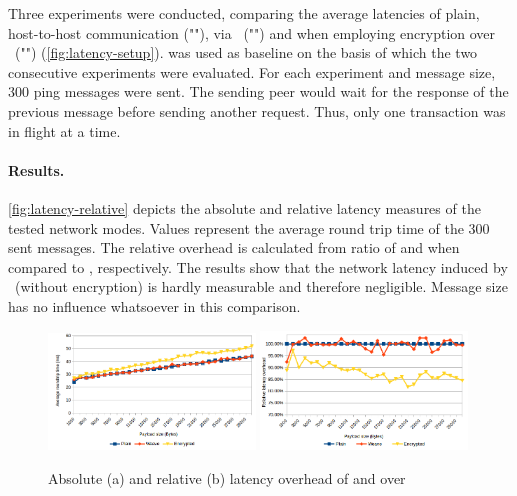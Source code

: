 Three experiments were conducted, comparing the average latencies of plain, host-to-host communication (""), via \wnet\ ("") and when employing encryption over \wnet\ ("") (\cf \autoref{fig:latency-setup}).  was used as baseline on the basis of which the two consecutive experiments were evaluated. For each experiment and message size, 300 ping messages were sent. The sending peer would wait for the response of the previous message before sending another request. Thus, only one transaction was in flight at a time.


\paragraph{Results.} 

\autoref{fig:latency-relative} depicts the absolute and relative latency measures of the tested network modes. Values represent the average round trip time of the 300 sent messages. The relative overhead is calculated from ratio of  and  when compared to , respectively. The results show that the network latency induced by \wnet\ (without encryption) is hardly measurable and therefore negligible. Message size has no influence whatsoever in this comparison. 


\begin{figure}[htpb]
  \centering
  \includegraphics[width=0.49\textwidth]{figures/latency-absolute}
  \includegraphics[width=0.49\textwidth]{figures/latency-relative}
  \caption[Latency overhead]{Absolute (a) and relative (b) latency overhead of  and  over }\label{fig:latency-relative}
\end{figure}

